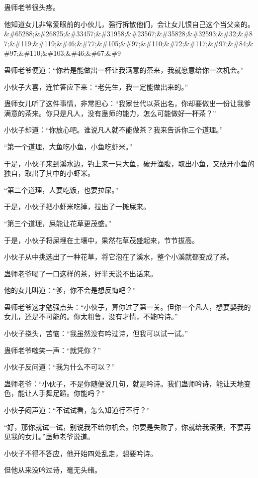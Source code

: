 \begin{this_body}
蛊师老爷很头疼。

他知道女儿非常爱眼前的小伙儿，强行拆散他们，会让女儿恨自己这个当父亲的。\&\#65288;\&\#26825;\&\#33457;\&\#31958;\&\#23567;\&\#35828;\&\#32593;\&\#32;\&\#87;\&\#119;\&\#119;\&\#46;\&\#77;\&\#105;\&\#97;\&\#110;\&\#72;\&\#117;\&\#97;\&\#84;\&\#97;\&\#110;\&\#103;\&\#46;\&\#67;\&\#9

蛊师老爷便道：“你若是能做出一杯让我满意的茶来，我就愿意给你一次机会。”

小伙子大喜，连忙答应下来：“老先生，我一定能做出来的。”

蛊师女儿听了这件事情，非常担心：“我家世代以茶出名，你却要做出一份让我爹满意的茶来。你只是凡人，没有蛊师的能力，怎么可能做好一杯茶？”

小伙子却道：“你放心吧。谁说凡人就不能做茶？我来告诉你三个道理。”

“第一个道理，大鱼吃小鱼，小鱼吃虾米。”

于是，小伙子来到溪水边，钓上来一只大鱼，破开渔腹，取出小鱼，又破开小鱼的独自，取出了其中的小虾米。

“第二个道理，人要吃饭，也要拉屎。”

于是，小伙子把小虾米吃掉，拉出了一摊屎来。

“第三个道理，屎能让花草更茂盛。”

于是，小伙子将屎埋在土壤中，果然花草茂盛起来，节节拔高。

小伙子从中挑选出了一种花草，将它泡在了溪水，整个小溪就都变成了茶。

蛊师老爷喝了一口这样的茶，好半天说不出话来。

他的女儿叫道：“爹，你不会是想反悔吧？”

蛊师老爷这才勉强点头：“小伙子，算你过了第一关。但你一个凡人，想要娶我的女儿，还是不可能的。你太粗鲁，没有才情，不能吟诗。”

小伙子挠头，苦恼：“我虽然没有吟过诗，但我可以试一试。”

蛊师老爷嗤笑一声：“就凭你？”

小伙子反问道：“我为什么不可以？”

蛊师老爷：“小伙子，不是你随便说几句，就是吟诗。我们蛊师吟诗，能让天地变色，能让人手舞足蹈。你能吗？”

小伙子闷声道：“不试试看，怎么知道行不行？”

“好，那你就试一试，别说我不给你机会。你要是失败了，你就给我滚蛋，不要再见我的女儿。”蛊师老爷说道。

小伙子不得不答应，他开始四处乱走，想要吟诗。

但他从来没吟过诗，毫无头绪。


\end{this_body}
